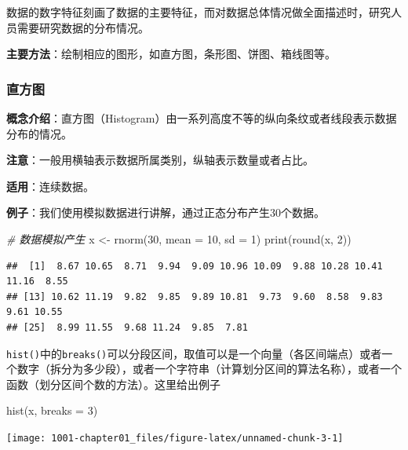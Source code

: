 \documentclass[
]{book}
\newenvironment{Shaded}{\begin{snugshade}}{\end{snugshade}}
\newcommand{\AttributeTok}[1]{\textcolor[rgb]{0.77,0.63,0.00}{#1}}
\newcommand{\CommentTok}[1]{\textcolor[rgb]{0.56,0.35,0.01}{\textit{#1}}}
\newcommand{\DecValTok}[1]{\textcolor[rgb]{0.00,0.00,0.81}{#1}}
\newcommand{\FunctionTok}[1]{\textcolor[rgb]{0.00,0.00,0.00}{#1}}
\newcommand{\NormalTok}[1]{#1}
\newcommand{\OtherTok}[1]{\textcolor[rgb]{0.56,0.35,0.01}{#1}}
\begin{document}
数据的数字特征刻画了数据的主要特征，而对数据总体情况做全面描述时，研究人员需要研究数据的分布情况。

\textbf{主要方法}：绘制相应的图形，如直方图，条形图、饼图、箱线图等。

\hypertarget{ux76f4ux65b9ux56fe}{%
\subsubsection{直方图}\label{ux76f4ux65b9ux56fe}}

\textbf{概念介绍}：直方图（Histogram）由一系列高度不等的纵向条纹或者线段表示数据分布的情况。

\textbf{注意}：一般用横轴表示数据所属类别，纵轴表示数量或者占比。

\textbf{适用}：连续数据。

\textbf{例子}：我们使用模拟数据进行讲解，通过正态分布产生30个数据。

\begin{Shaded}
\begin{Highlighting}[]
\CommentTok{\# 数据模拟产生}
\NormalTok{x }\OtherTok{\textless{}{-}} \FunctionTok{rnorm}\NormalTok{(}\DecValTok{30}\NormalTok{, }\AttributeTok{mean =} \DecValTok{10}\NormalTok{, }\AttributeTok{sd =} \DecValTok{1}\NormalTok{)}
\FunctionTok{print}\NormalTok{(}\FunctionTok{round}\NormalTok{(x, }\DecValTok{2}\NormalTok{))}
\end{Highlighting}
\end{Shaded}

\begin{verbatim}
##  [1]  8.67 10.65  8.71  9.94  9.09 10.96 10.09  9.88 10.28 10.41 11.16  8.55
## [13] 10.62 11.19  9.82  9.85  9.89 10.81  9.73  9.60  8.58  9.83  9.61 10.55
## [25]  8.99 11.55  9.68 11.24  9.85  7.81
\end{verbatim}

\texttt{hist()}中的\texttt{breaks()}可以分段区间，取值可以是一个向量（各区间端点）或者一个数字（拆分为多少段），或者一个字符串（计算划分区间的算法名称），或者一个函数（划分区间个数的方法）。这里给出例子

\begin{Shaded}
\begin{Highlighting}[]
\FunctionTok{hist}\NormalTok{(x, }\AttributeTok{breaks =} \DecValTok{3}\NormalTok{)}
\end{Highlighting}
\end{Shaded}

\begin{center}\texttt{[image: 1001-chapter01\_files/figure-latex/unnamed-chunk-3-1]} \end{center}
\end{document}

